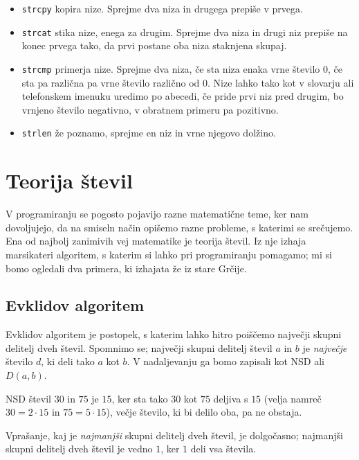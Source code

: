 \documentclass{book}
\begin{document}
\begin{itemize}
    \item \verb+strcpy+ kopira nize. Sprejme dva niza in drugega prepiše v
        prvega.
    \item \verb+strcat+ stika nize, enega za drugim. Sprejme dva niza in drugi
        niz prepiše na konec prvega tako, da prvi postane oba niza staknjena
        skupaj.
    \item \verb+strcmp+ primerja nize. Sprejme dva niza, če sta niza enaka vrne
        število 0, če sta pa različna pa vrne število različno od 0. Nize lahko
        tako kot v slovarju ali telefonskem imenuku uredimo po abecedi, če
        pride prvi niz pred drugim, bo vrnjeno število negativno, v obratnem
        primeru pa pozitivno.
    \item \verb+strlen+ že poznamo, sprejme en niz in vrne njegovo dolžino.
\end{itemize}

\begin{examples}
\end{examples}

\chapter{Teorija števil}


V programiranju se pogosto pojavijo razne matematične teme, ker nam dovoljujejo,
da na smiseln način opišemo razne probleme, s katerimi se srečujemo.
Ena od najbolj zanimivih vej matematike je teorija števil.
Iz nje izhaja marsikateri algoritem, s katerim si lahko pri programiranju
pomagamo; mi si bomo ogledali dva primera, ki izhajata že iz stare Grčije.

\section{Evklidov algoritem}

Evklidov algoritem je postopek, s katerim lahko hitro poiščemo največji skupni
delitelj dveh števil.
Spomnimo se; največji skupni delitelj števil $a$ in $b$ je \emph{največje}
število $d$, ki deli tako $a$ kot $b$.
V nadaljevanju ga bomo zapisali kot NSD ali $D(a, b)$.
\begin{examples}
  NSD števil $30$ in $75$ je $15$, ker sta tako $30$ kot
  $75$ deljiva s $15$ (velja namreč $30 = 2 \cdot 15$ in $75 = 5 \cdot 15$),
  večje število, ki bi delilo oba, pa ne obstaja.
\end{examples}
\begin{examples}
  Vprašanje, kaj je \emph{najmanjši} skupni delitelj dveh števil, je dolgočasno;
  najmanjši skupni delitelj dveh števil je vedno $1$, ker $1$ deli vsa števila.
\end{examples}
\end{document}

